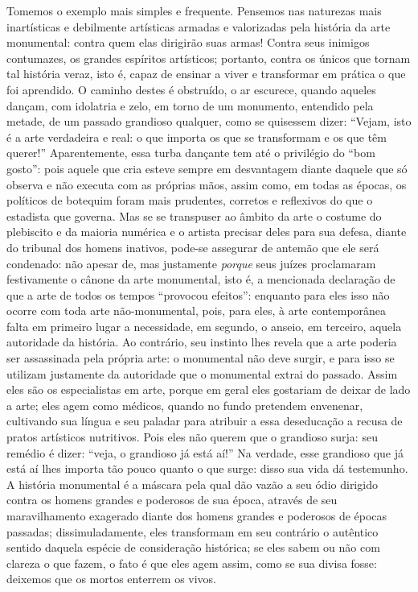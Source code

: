 Tomemos o exemplo mais simples e frequente. Pensemos nas naturezas mais
inartísticas e debilmente artísticas armadas e valorizadas pela história
da arte monumental: contra quem elas dirigirão suas armas! Contra seus
inimigos contumazes, os grandes espíritos artísticos; portanto, contra
os únicos que tornam tal história veraz, isto é, capaz de ensinar a
viver e transformar em prática o que foi aprendido. O caminho destes é
obstruído, o ar escurece, quando aqueles dançam, com idolatria e zelo,
em torno de um monumento, entendido pela metade, de um passado grandioso
qualquer, como se quisessem dizer: ``Vejam, isto é a arte verdadeira e
real: o que importa os que se transformam e os que têm querer!''
Aparentemente, essa turba dançante tem até o privilégio do ``bom
gosto'': pois aquele que cria esteve sempre em desvantagem diante
daquele que só observa e não executa com as próprias mãos, assim como,
em todas as épocas, os políticos de botequim foram mais prudentes,
corretos e reflexivos do que o estadista que governa. Mas se se
transpuser ao âmbito da arte o costume do plebiscito e da maioria
numérica e o artista precisar deles para sua defesa, diante do tribunal
dos homens inativos, pode-se assegurar de antemão que ele será
condenado: não apesar de, mas justamente \emph{porque} seus juízes
proclamaram festivamente o cânone da arte monumental, isto é, a
mencionada declaração de que a arte de todos os tempos ``provocou
efeitos'': enquanto para eles isso não ocorre com toda arte
não-monumental, pois, para eles, à arte contemporânea falta em primeiro
lugar a necessidade, em segundo, o anseio, em terceiro, aquela
autoridade da história. Ao contrário, seu instinto lhes revela que a
arte poderia ser assassinada pela própria arte: o monumental não deve
surgir, e para isso se utilizam justamente da autoridade que o
monumental extrai do passado. Assim eles são os especialistas em arte,
porque em geral eles gostariam de deixar de lado a arte; eles agem como
médicos, quando no fundo pretendem envenenar, cultivando sua língua e
seu paladar para atribuir a essa deseducação a recusa de pratos
artísticos nutritivos. Pois eles não querem que o grandioso surja: seu
remédio é dizer: ``veja, o grandioso já está aí!'' Na verdade, esse
grandioso que já está aí lhes importa tão pouco quanto o que surge:
disso sua vida dá testemunho. A história monumental é a máscara pela
qual dão vazão a seu ódio dirigido contra os homens grandes e poderosos
de sua época, através de seu maravilhamento exagerado diante dos homens
grandes e poderosos de épocas passadas; dissimuladamente, eles
transformam em seu contrário o autêntico sentido daquela espécie de
consideração histórica; se eles sabem ou não com clareza o que fazem, o
fato é que eles agem assim, como se sua divisa fosse: deixemos que os
mortos enterrem os vivos.

